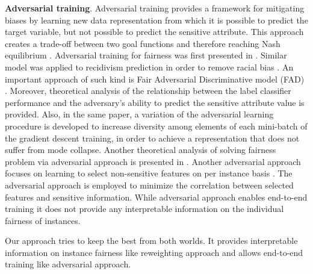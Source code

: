 \documentclass[preprint,12pt]{elsarticle}
\begin{document}
\textbf{Adversarial training}. Adversarial training provides a framework for mitigating biases by learning new data representation from which it is possible to predict the target variable, but not possible to predict the sensitive attribute. This approach creates a trade-off between two goal functions and therefore reaching Nash equilibrium \cite{goodfellow2014generative}.
Adversarial training for fairness was first presented in \cite{zhang2018mitigating}. Similar model was applied to recidivism prediction in order to remove racial bias \cite{wadsworth2018achieving}.
An important approach of such kind is Fair Adversarial Discriminative model (FAD) \cite{adel2019one}. Moreover, theoretical analysis of the relationship between the label classifier performance and the adversary’s ability to predict the sensitive attribute value is provided. Also, in the same paper, a variation of the adversarial learning procedure is developed to increase diversity among elements of each mini-batch of the gradient descent training, in order to achieve a representation that does not suffer from mode collapse.
Another theoretical analysis of solving fairness problem via adversarial approach is presented in \cite{madras2018learning}.
Another adversarial approach focuses on learning to select non-sensitive features on per instance basis \cite{wang2019approaching}. The adversarial approach is employed to minimize the correlation between selected features and sensitive information. While adversarial approach enables end-to-end training it does not provide any interpretable information on the individual fairness of instances.

\vspace{2mm}
Our approach tries to keep the best from both worlds. It provides interpretable information on instance fairness like reweighting approach and allows end-to-end training like adversarial approach.
\end{document}
